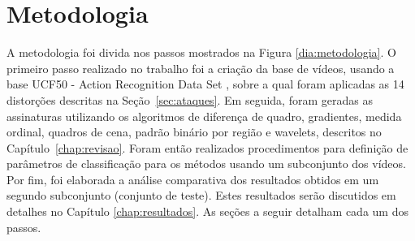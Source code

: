 
\chapter{Metodologia}
\label{chap:metodologia}

A metodologia foi divida nos passos mostrados na Figura \ref{dia:metodologia}. O primeiro passo realizado no trabalho foi a criação da base de vídeos, usando a base UCF50 - Action Recognition Data Set \cite{reddy2013recognizing}, sobre a qual foram aplicadas as 14 distorções descritas na Seção~\ref{sec:ataques}. Em seguida, foram geradas as assinaturas utilizando os algoritmos de diferença de quadro, gradientes, medida ordinal, quadros de cena, padrão binário por região e wavelets, descritos no Capítulo~\ref{chap:revisao}. Foram então realizados procedimentos para definição de parâmetros de classificação para os métodos usando um subconjunto dos vídeos. Por fim, foi elaborada a análise comparativa dos resultados obtidos em um segundo subconjunto (conjunto de teste). Estes resultados serão discutidos em detalhes no Capítulo \ref{chap:resultados}. As seções a seguir detalham cada um dos passos.


